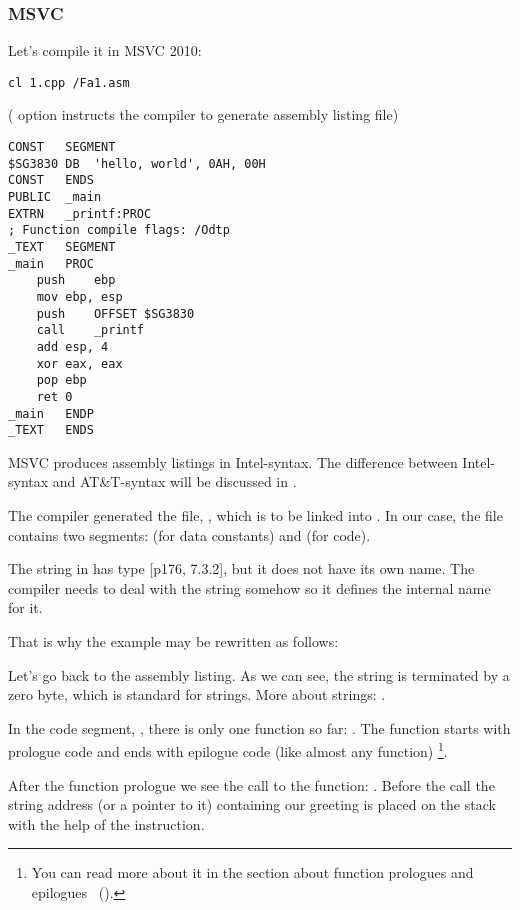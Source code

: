 \subsubsection{MSVC}

Let's compile it in MSVC 2010:

\begin{lstlisting}
cl 1.cpp /Fa1.asm
\end{lstlisting}

( option instructs the compiler to generate assembly listing file)

\begin{lstlisting}[caption=MSVC 2010]
CONST	SEGMENT
$SG3830	DB	'hello, world', 0AH, 00H
CONST	ENDS
PUBLIC	_main
EXTRN	_printf:PROC
; Function compile flags: /Odtp
_TEXT	SEGMENT
_main	PROC
	push	ebp
	mov	ebp, esp
	push	OFFSET $SG3830
	call	_printf
	add	esp, 4
	xor	eax, eax
	pop	ebp
	ret	0
_main	ENDP
_TEXT	ENDS
\end{lstlisting}

MSVC produces assembly listings in Intel-syntax.
The difference between Intel-syntax and AT\&T-syntax will be discussed in .

The compiler generated the file, , which is to be linked into .
In our case, the file contains two segments:  (for data constants) and  (for code).

\label{string_is_const_char}
The string  in \CCpp has type [\TCPPPL p176, 7.3.2], but it does not have its own name.
The compiler needs to deal with the string somehow so it defines the internal name  for it.

That is why the example may be rewritten as follows:



Let's go back to the assembly listing. As we can see, the string is terminated by a zero byte, which is standard for \CCpp strings.
More about \CCpp strings: .

In the code segment, , there is only one function so far: \main{}.
The function \main starts with prologue code and ends with epilogue code (like almost any function)
\footnote{You can read more about it in the section about function prologues and epilogues ~().}.

After the function prologue we see the call to the \printf{} function: .
Before the call the string address (or a pointer to it) containing our greeting is placed on the stack with the help of the \PUSH instruction.

